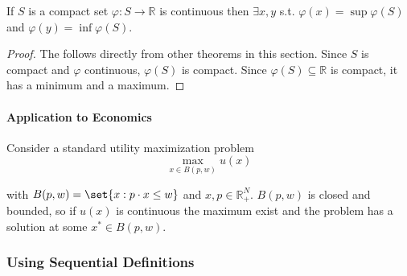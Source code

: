 \documentclass{article}
\begin{document}
\begin{theorem}\label{thm:lecture3_continuity_weierstrass_evt}
  If $S$ is a compact set $\varphi: S \to \mathbb{R}$ is continuous then $\exists x, y$ s.t. $\varphi(x) = \sup \varphi(S)$ and $\varphi(y) = \inf \varphi(S)$.
\end{theorem}

\begin{proof}
  The  follows directly from other theorems in this section. Since $S$ is compact and $\varphi$ continuous, $\varphi(S)$ is compact. Since $\varphi(S) \subseteq \mathbb{R}$ is compact, it has a minimum and a maximum.
\end{proof}

\paragraph{Application to Economics}
\label{par:application_to_economics}

Consider a standard utility maximization problem
\[
  \max_{x \in B(p, w)} u(x)
\]

with $B(p, w) = \set{x: p \cdot x \le w}$ and $x, p \in \mathbb{R}^N_+$. $B(p, w)$ is closed and bounded, so if $u(x)$ is continuous the maximum exist and the problem has a solution at some $x^* \in B(p, w)$.

\subsubsection{Using Sequential Definitions}
\label{ssub:using_sequential_definitions}
\end{document}
